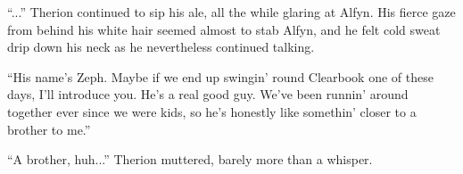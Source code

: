 ``...'' Therion continued to sip his ale, all the while glaring at Alfyn. His fierce gaze from behind his white hair seemed almost to stab Alfyn, and he felt cold sweat drip down his neck as he nevertheless continued talking.

``His name's Zeph. Maybe if we end up swingin' round Clearbook one of these days, I'll introduce you. He's a real good guy. We've been runnin' around together ever since we were kids, so he's honestly like somethin' closer to a brother to me.''

``A brother, huh...'' Therion muttered, barely more than a whisper.

\printendnotes


